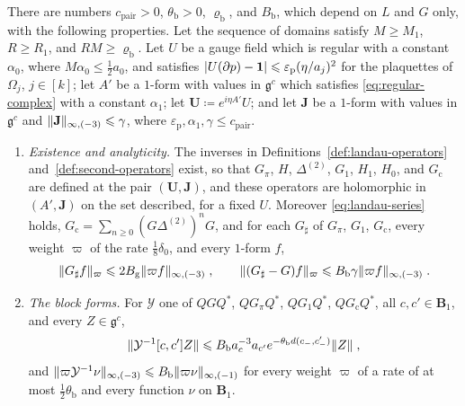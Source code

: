 \documentclass[11pt]{preprint}
\newcommand{\id}{\mathbf 1}
\DeclarePairedDelimiter{\abs}{\lvert}{\rvert}
\DeclarePairedDelimiter{\norm}{\lVert}{\rVert}
\numberwithin{equation}{section}
\begin{document}
\begin{proposition}\label{prop:pair-operators}
There are numbers $c_{\mathrm{pair}} > 0$, $\theta_{\mathrm b} > 0$, $\varrho_{\mathrm b}$, and $B_{\mathrm b}$, which depend on $L$ and $G$ only, with the following properties. Let the sequence of domains satisfy $M \geqslant M_1$, $R \geqslant R_1$, and $RM \geqslant \varrho_{\mathrm b}$. Let $U$ be a gauge field which is regular with a constant $\alpha_0$, where $M\alpha_0 \leqslant \frac{1}{2}a_0$, and satisfies $\abs{U(\partial p) - \id} \leqslant \varepsilon_{\mathrm p}(\eta/a_j)^2$ for the plaquettes of $\Omega_j$, $j \in [k]$; let $A'$ be a $1$-form with values in $\mathfrak g^c$ which satisfies \eqref{eq:regular-complex} with a constant $\alpha_1$; let $\mathbf U \coloneqq e^{i\eta A'}U$; and let $\mathbf J$ be a $1$-form with values in $\mathfrak g^c$ and $\norm{\mathbf J}_{\infty,(-3)} \leqslant \gamma$, where $\varepsilon_{\mathrm p}, \alpha_1, \gamma \leqslant c_{\mathrm{pair}}$.
\begin{enumerate}[label=(\roman*)]
\item \emph{Existence and analyticity.} The inverses in Definitions~\ref{def:landau-operators} and~\ref{def:second-operators} exist, so that $G_\pi$, $H$, $\Delta^{(2)}$, $G_1$, $H_1$, $H_0$, and $G_{\mathrm c}$ are defined at the pair $(\mathbf U, \mathbf J)$, and these operators are holomorphic in $(A', \mathbf J)$ on the set described, for a fixed $U$. Moreover \eqref{eq:landau-series} holds, $G_{\mathrm c} = \sum_{n \geqslant 0}(G\Delta^{(2)})^nG$, and for each $G_\sharp$ of $G_\pi$, $G_1$, $G_{\mathrm c}$, every weight $\varpi$ of the rate $\frac{1}{8}\delta_0$, and every $1$-form $f$,
\begin{equation}\label{eq:pair-propagators}
    \norm{G_\sharp f}_\varpi \leqslant 2B_{\mathrm g}\norm{\varpi f}_{\infty,(-3)}\;,
    \qquad
    \norm{(G_\sharp - G)f}_\varpi \leqslant B_{\mathrm b}\gamma\norm{\varpi f}_{\infty,(-3)}\;.
\end{equation}
\item \emph{The block forms.} For $\mathcal Y$ one of $QGQ^*$, $QG_\pi Q^*$, $QG_1Q^*$, $QG_{\mathrm c}Q^*$, all $c, c' \in \mathbf B_1$, and every $Z \in \mathfrak g^c$,
\begin{equation}\label{eq:block-form-entries}
    \norm{\mathcal Y^{-1}[c, c']Z} \leqslant B_{\mathrm b}a_c^{-3}a_{c'}e^{-\theta_{\mathrm b}d(c_-, c'_-)}\norm Z\;,
\end{equation}
and $\norm{\varpi\mathcal Y^{-1}\nu}_{\infty,(-3)} \leqslant B_{\mathrm b}\norm{\varpi\nu}_{\infty,(-1)}$ for every weight $\varpi$ of a rate of at most $\frac{1}{2}\theta_{\mathrm b}$ and every function $\nu$ on $\mathbf B_1$.

\end{enumerate}
\end{proposition}
\end{document}

